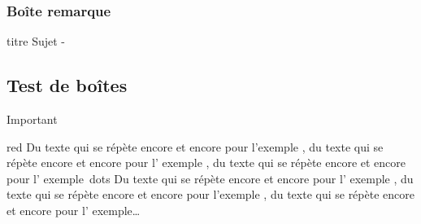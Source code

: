 \documentclass[b,e,cours]{D:/Dropbox/enseignement/CPGE/raphaelpoiree/paquets/classe_kara}
\begin{document}
\subsubsection{Boîte remarque}
\begin{frame}
\begin{remarque}{titre}
Sujet - \\
\end{remarque}
\end{frame}
\subsection{Test de boîtes}
\begin{frame}
\begin{bclogo}[logo=\bcinfo,barre=none,noborder=true]{Important}%
\begin{gbar}{red}
Du texte qui se répète encore et encore pour l’exemple , du
texte qui se répète encore et encore pour l’ exemple , du texte
qui se répète encore et encore pour l’ exemple\ dots Du texte
qui se répète encore et encore pour l’ exemple , du texte qui se
répète encore et encore pour l’exemple , du texte qui se
répète encore et encore pour l’ exemple\dots
\end{gbar}
\end{bclogo}
\end{frame}
\end{document}
